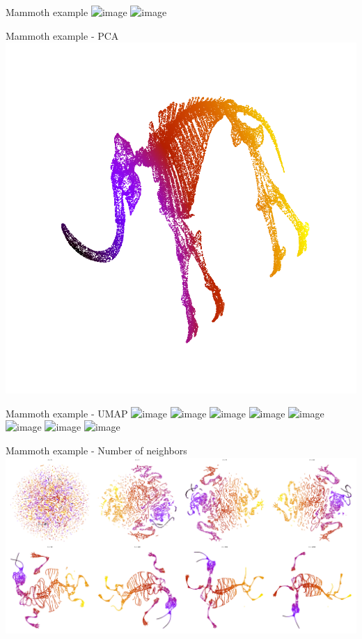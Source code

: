 \documentclass{irdbeamer}
\begin{document}
\begin{frame}{Mammoth example}
    \centering
    \vspace{-.5cm}
    \includegraphics<1>[width=.6\textwidth]{./figs/mammoth/3d_single.png}%
    \includegraphics<2>[width=.6\textwidth]{./figs/mammoth/3d_color.png}%
\end{frame}

\begin{frame}{Mammoth example - PCA}
    \centering
    \vspace{-.5cm}
    \includegraphics[width=.6\textwidth]{./figs/mammoth/pca.png}
\end{frame}

\begin{frame}{Mammoth example - UMAP}
    \centering
    \vspace{-.5cm}
    \includegraphics<1>[width=.6\textwidth]{./figs/mammoth/n5.png}%
    \includegraphics<2>[width=.6\textwidth]{./figs/mammoth/n7.png}%
    \includegraphics<3>[width=.6\textwidth]{./figs/mammoth/n9.png}%
    \includegraphics<4>[width=.6\textwidth]{./figs/mammoth/n10.png}%
    \includegraphics<5>[width=.6\textwidth]{./figs/mammoth/n50.png}%
    \includegraphics<6>[width=.6\textwidth]{./figs/mammoth/n100.png}%
    \includegraphics<7>[width=.6\textwidth]{./figs/mammoth/n500.png}%
    \includegraphics<8>[width=.6\textwidth]{./figs/mammoth/n1000.png}%
\end{frame}

\begin{frame}{Mammoth example - Number of neighbors}
    \centering
    \includegraphics[width=.8\textwidth]{./figs/mammoth/combined_scatter_plots.png}
\end{frame}
\end{document}
